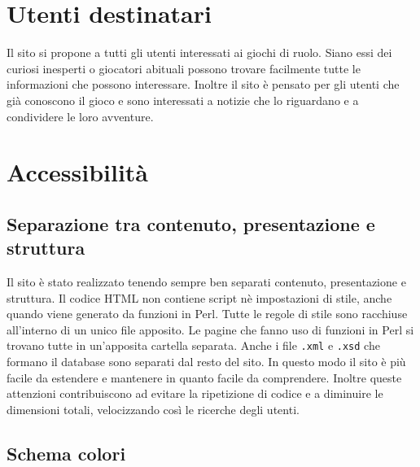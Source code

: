 \documentclass{article}
\begin{document}
\section{Utenti destinatari}
	Il sito si propone a tutti gli utenti interessati ai giochi di ruolo. Siano essi dei curiosi inesperti o giocatori 
	abituali possono trovare facilmente tutte le informazioni che possono interessare. Inoltre il sito è pensato per gli
	utenti che già conoscono il gioco e sono interessati a notizie che lo riguardano e a condividere le loro avventure.

 \newpage

\section{Accessibilità}

\subsection{Separazione tra contenuto, presentazione e struttura}
	Il sito è stato realizzato tenendo sempre ben separati contenuto, presentazione e struttura.
	Il codice HTML non contiene script nè impostazioni di stile, anche quando viene generato da funzioni in Perl.
	Tutte le regole di stile sono racchiuse all'interno di un unico file apposito.
	Le pagine che fanno uso di funzioni in Perl si trovano tutte in un'apposita cartella separata.
	Anche i file \texttt{.xml} e \texttt{.xsd} che formano il database sono separati dal resto del sito.
	In questo modo il sito è più facile da estendere e mantenere in quanto facile da comprendere.
	Inoltre queste attenzioni contribuiscono ad evitare la ripetizione di codice e a diminuire le dimensioni totali,
	velocizzando così le ricerche degli utenti.

\subsection{Schema colori}
\end{document}
